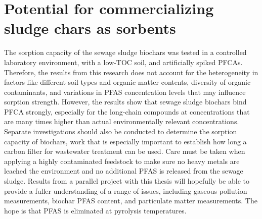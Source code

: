 
\section{Potential for commercializing sludge chars as sorbents}
The sorption capacity of the sewage sludge biochars was tested in a controlled laboratory environment, with a low-TOC soil, and artificially spiked PFCAs. Therefore, the results from this research does not account for the heterogeneity in factors like different soil types and organic matter contents, diversity of organic contaminants, and variations in PFAS concentration levels that may influence sorption strength. However, the results show that sewage sludge biochars bind PFCA strongly, especially for the long-chain compounds at concentrations that are many times higher than actual environmentally relevant concentrations. Separate investigations should also be conducted to determine the sorption capacity of biochars, work that is especially important to establish how long a carbon filter for wastewater treatment can be used. Care must be taken when applying a highly contaminated feedstock to make sure no heavy metals are leached the environment and no additional PFAS is released from the sewage sludge. Results from a parallel project with this thesis will hopefully be able to provide a fuller understanding of a range of issues, including gaseous pollution measurements, biochar PFAS content, and particulate matter measurements. The hope is that PFAS is eliminated at pyrolysis temperatures.

